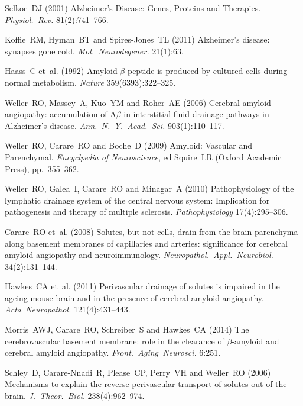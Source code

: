 \documentclass{frontiersFPHY} %
\begin{document}
\begin{thebibliography}{10}
Selkoe~DJ (2001) Alzheimer's Disease: Genes, Proteins and Therapies. {\em Physiol.~Rev.} 81(2):741--766.

Koffie~RM, Hyman~BT and Spires-Jones~TL (2011) Alzheimer's disease: synapses gone cold. {\em Mol.~Neurodegener.} 21(1):63.

Haass~C et~al. (1992) Amyloid $\beta$-peptide is produced by cultured cells during normal metabolism. {\em Nature} 359(6393):322--325.

Weller~RO, Massey~A, Kuo~YM and Roher~AE (2006) Cerebral amyloid angiopathy: accumulation of A$\beta$ in interstitial fluid drainage pathways in Alzheimer's disease. {\em Ann.~N.~Y.~Acad.~Sci.} 903(1):110--117.

Weller~RO, Carare~RO and Boche~D (2009) Amyloid: Vascular and Parenchymal. {\em Encyclpedia of Neuroscience}, ed Squire~LR (Oxford Academic Press), pp.~355--362.

Weller~RO, Galea~I, Carare~RO and Minagar~A (2010) Pathophysiology of the lymphatic drainage system of the central nervous system: Implication for pathogenesis and therapy of multiple sclerosis. {\em Pathophysiology} 17(4):295--306.

Carare~RO et~al. (2008) Solutes, but not cells, drain from the brain parenchyma along basement membranes of capillaries and arteries: significance for cerebral amyloid angiopathy and neuroimmunology. {\em Neuropathol.~Appl.~Neurobiol.} 34(2):131--144.

Hawkes~CA et~al. (2011) Perivascular drainage of solutes is impaired in the ageing mouse brain and in the presence of cerebral amyloid angiopathy. {\em Acta~Neuropathol.} 121(4):431--443.

Morris~AWJ, Carare~RO, Schreiber~S and Hawkes~CA (2014) The cerebrovascular basement membrane: role in the clearance of $\beta$-amyloid and cerebral amyloid angiopathy. {\em Front.~Aging~Neurosci.} 6:251.

Schley~D, Carare-Nnadi~R, Please~CP, Perry~VH and Weller~RO (2006) Mechanisms to explain the reverse perivascular transport of solutes out of the brain. {\em J.~Theor.~Biol.} 238(4):962--974.


\end{thebibliography}
\end{document}

